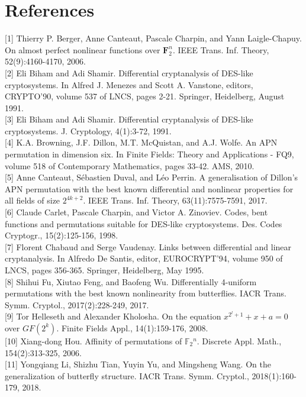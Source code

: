 \documentclass[10pt]{article}
\begin{document}
\section*{References}
[1] Thierry P. Berger, Anne Canteaut, Pascale Charpin, and Yann Laigle-Chapuy. On almost perfect nonlinear functions over $\mathbf{F}_{2}^{n}$. IEEE Trans. Inf. Theory, 52(9):4160-4170, 2006.\\[0pt]
[2] Eli Biham and Adi Shamir. Differential cryptanalysis of DES-like cryptosystems. In Alfred J. Menezes and Scott A. Vanstone, editors, CRYPTO'90, volume 537 of LNCS, pages 2-21. Springer, Heidelberg, August 1991.\\[0pt]
[3] Eli Biham and Adi Shamir. Differential cryptanalysis of DES-like cryptosystems. J. Cryptology, 4(1):3-72, 1991.\\[0pt]
[4] K.A. Browning, J.F. Dillon, M.T. McQuistan, and A.J. Wolfe. An APN permutation in dimension six. In Finite Fields: Theory and Applications - FQ9, volume 518 of Contemporary Mathematics, pages 33-42. AMS, 2010.\\[0pt]
[5] Anne Canteaut, Sébastien Duval, and Léo Perrin. A generalisation of Dillon's APN permutation with the best known differential and nonlinear properties for all fields of size $2^{4 k+2}$. IEEE Trans. Inf. Theory, 63(11):7575-7591, 2017.\\[0pt]
[6] Claude Carlet, Pascale Charpin, and Victor A. Zinoviev. Codes, bent functions and permutations suitable for DES-like cryptosystems. Des. Codes Cryptogr., 15(2):125-156, 1998.\\[0pt]
[7] Florent Chabaud and Serge Vaudenay. Links between differential and linear cryptanalysis. In Alfredo De Santis, editor, EUROCRYPT'94, volume 950 of LNCS, pages 356-365. Springer, Heidelberg, May 1995.\\[0pt]
[8] Shihui Fu, Xiutao Feng, and Baofeng Wu. Differentially 4-uniform permutations with the best known nonlinearity from butterflies. IACR Trans. Symm. Cryptol., 2017(2):228-249, 2017.\\[0pt]
[9] Tor Helleseth and Alexander Kholosha. On the equation $x^{2^{l}+1}+x+a=0$ over $G F\left(2^{k}\right)$. Finite Fields Appl., 14(1):159-176, 2008.\\[0pt]
[10] Xiang-dong Hou. Affinity of permutations of $\mathbb{F}_{2}{ }^{n}$. Discrete Appl. Math., 154(2):313-325, 2006.\\[0pt]
[11] Yongqiang Li, Shizhu Tian, Yuyin Yu, and Mingsheng Wang. On the generalization of butterfly structure. IACR Trans. Symm. Cryptol., 2018(1):160-179, 2018.\\[0pt]
\end{document}
